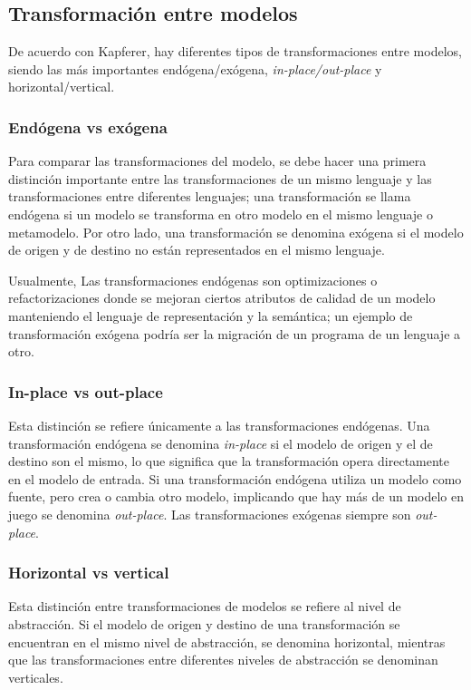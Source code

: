 \subsection{Transformación entre modelos}
De acuerdo con Kapferer\cite{kapferer_model_2019}, hay diferentes tipos de transformaciones entre modelos, siendo las más importantes endógena/exógena, \textit{in-place/out-place} y horizontal/vertical. 

\subsubsection{Endógena vs exógena}
Para comparar las transformaciones del modelo, se debe hacer una primera distinción importante entre las transformaciones de un mismo lenguaje y las transformaciones entre diferentes lenguajes; una transformación se llama endógena si un modelo se transforma en otro modelo en el mismo lenguaje o metamodelo. Por otro lado, una transformación se denomina exógena si el modelo de origen y de destino no están representados en el mismo lenguaje.


Usualmente, Las transformaciones endógenas son optimizaciones o refactorizaciones donde se mejoran ciertos atributos de calidad de un modelo manteniendo el lenguaje de representación y la semántica; un ejemplo de transformación exógena podría ser la migración de un programa de un lenguaje a otro.

\subsubsection{In-place vs out-place}

Esta distinción se refiere únicamente a las transformaciones endógenas. Una transformación endógena se denomina \textit{in-place} si el modelo de origen y el de destino son el mismo, lo que significa que la transformación opera directamente en el modelo de entrada. Si una transformación endógena utiliza un modelo como fuente, pero crea o cambia otro modelo, implicando que hay más de un modelo en juego se denomina \textit{out-place}. Las transformaciones exógenas siempre son \textit{out-place}.

\subsubsection{Horizontal vs vertical}

Esta distinción entre transformaciones de modelos se refiere al nivel de abstracción. Si el modelo de origen y destino de una transformación se encuentran en el mismo nivel de abstracción, se denomina horizontal, mientras que las transformaciones entre diferentes niveles de abstracción se denominan verticales.

